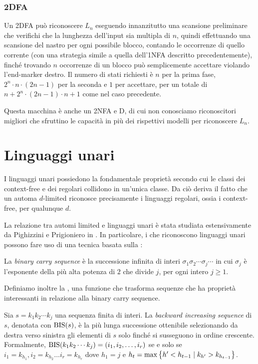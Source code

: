 \subsubsection{2DFA}
Un 2DFA può riconoscere $L_n$ eseguendo innanzitutto una scansione preliminare che verifichi che la lunghezza dell'input sia multipla di $n$, quindi effettuando una scansione del nastro per ogni possibile blocco, contando le occorrenze di quello corrente (con una strategia simile a quella dell'1NFA descritto precedentemente), finché trovando $n$ occorrenze di un blocco può semplicemente accettare violando l'end-marker destro. Il numero di stati richiesti è $n$ per la prima fase, $2^n\cdot n\cdot (2n-1)$ per la seconda e $1$ per accettare, per un totale di $n+2^n\cdot (2n-1)\cdot n+1$ come nel caso precedente.

Questa macchina è anche un 2NFA e D, di cui non conosciamo riconoscitori migliori che sfruttino le capacità in più dei rispettivi modelli per riconoscere $L_n$.



\section{Linguaggi unari}\label{sec:wit:un}
I linguaggi unari possiedono la fondamentale proprietà secondo cui le classi dei context-free e dei regolari collidono in un'unica classe. Da ciò deriva il fatto che un automa $d$-limited riconosce precisamente i linguaggi regolari, ossia i context-free, per qualunque $d$.

La relazione tra automi limited e linguaggi unari è stata studiata estensivamente da Pighizzini e Prigioniero in \cite{Pighizzini:19:limitedunary}. In particolare, i  che riconoscono linguaggi unari possono fare uso di una tecnica basata sulla :
\begin{defin}
	La \emph{binary carry sequence} è la successione infinita di interi $\sigma_1\sigma_2\cdots\sigma_j\cdots$ in cui $\sigma_j$ è l'esponente della più alta potenza di $2$ che divide $j$, per ogni intero $j\geq1$.
\end{defin}

Definiamo inoltre la , una funzione che trasforma sequenze che ha proprietà interessanti in relazione alla binary carry sequence.
\begin{defin}
	Sia $s=k_1k_2\cdots k_j$ una sequenza finita di interi. La \emph{backward increasing sequence} di $s$, denotata con $\mathrm{BIS}(s)$, è la più lunga successione ottenibile selezionando da destra verso sinistra gli elementi di $s$ solo finché si susseguono in ordine crescente. Formalmente, $\mathrm{BIS}(k_1k_2\cdots k_j)=(i_1,i_2,\dots,i_r)$ se e solo se $i_1=k_{h_1},i_2=k_{h_2}\dots i_r=k_{h_r}$ dove $h_1=j$ e $h_t=\max\left\{ h'<h_{t-1}\mid k_{h'}>k_{h_{t-1}} \right\}$.
\end{defin}

